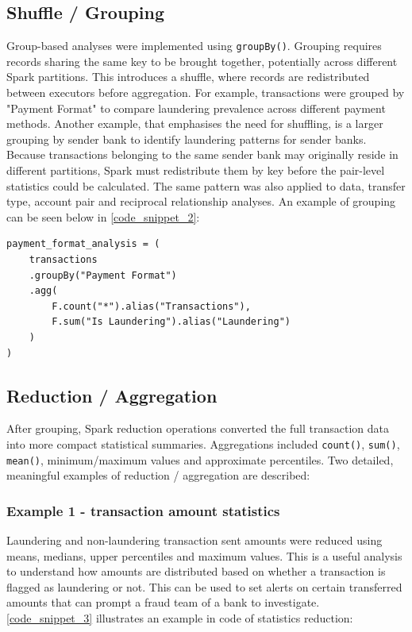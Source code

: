 \subsection{Shuffle / Grouping}

Group-based analyses were implemented using \texttt{groupBy()}. Grouping requires records sharing the same key to be brought together, potentially across different Spark partitions. This introduces a shuffle, where records are redistributed between executors before aggregation. For example, transactions were grouped by "Payment Format" to compare laundering prevalence across different payment methods. Another example, that emphasises the need for shuffling, is a larger grouping by sender bank to identify laundering patterns for sender banks. Because transactions belonging to the same sender bank may originally reside in different partitions, Spark must redistribute them by key before the pair-level statistics could be calculated. The same pattern was also applied to data, transfer type, account pair and reciprocal relationship analyses. An example of grouping can be seen below in \autoref{code_snippet_2}:

\begin{lstlisting}[caption={PySpark Payment Format Grouping}, label={code_snippet_2}]
payment_format_analysis = (
    transactions
    .groupBy("Payment Format")
    .agg(
        F.count("*").alias("Transactions"),
        F.sum("Is Laundering").alias("Laundering")
    )
)
\end{lstlisting}

\subsection{Reduction / Aggregation}

After grouping, Spark reduction operations converted the full transaction data into more compact statistical summaries. Aggregations included \texttt{count()}, \texttt{sum()}, \texttt{mean()}, minimum/maximum values and approximate percentiles. Two detailed, meaningful examples of reduction / aggregation are described:

\subsubsection{Example 1 - transaction amount statistics}

Laundering and non-laundering transaction sent amounts were reduced using means, medians, upper percentiles and maximum values. This is a useful analysis to understand how amounts are distributed based on whether a transaction is flagged as laundering or not. This can be used to set alerts on certain transferred amounts that can prompt a fraud team of a bank to investigate. \autoref{code_snippet_3} illustrates an example in code of statistics reduction:

